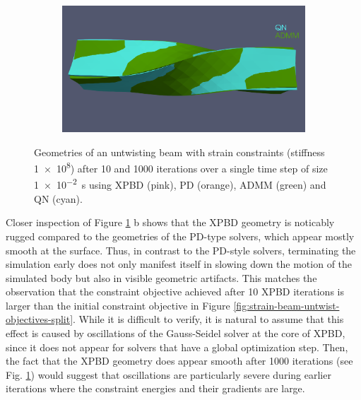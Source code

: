 \begin{figure}
\begin{subfigure}{0.49\textwidth}
    \end{subfigure}
    \hspace{0.001\textwidth}
    \begin{subfigure}{0.49\textwidth}
        \includegraphics[width=\textwidth, trim={0 4.5cm 0 2.15cm}, clip]{figures/strain_beam_untwist_QN_vs_ADMM_10_iterations.png}
    \end{subfigure}
    \caption{Geometries of an untwisting beam with strain constraints (stiffness \num{1e8}) after 10 and 1000 iterations over a single time step of size 
        \SI{1e-2}{\second} using XPBD (pink), PD (orange), ADMM (green) and QN (cyan).}
    \label{fig:strain-beam-untwist-geometries}
\end{figure}

Closer inspection of Figure \ref{fig:strain-beam-untwist-geometries} b shows that the XPBD geometry is noticably rugged compared to the geometries of the PD-type 
solvers, which 
appear mostly smooth at the surface. Thus, in contrast to the PD-style solvers, terminating the simulation early does not only manifest itself in slowing down 
the motion of the simulated body but also in visible geometric artifacts. This matches the observation that the constraint objective achieved after 10 XPBD iterations 
is larger than the initial constraint objective in Figure \ref{fig:strain-beam-untwist-objectives-split}. While it is difficult to verify, it is natural to assume that this 
effect is caused by oscillations of the Gauss-Seidel solver at the core of XPBD, since it does not appear for solvers that have a global optimization step. Then, the 
fact that the XPBD geometry does appear smooth after 1000 iterations (see Fig. \ref{fig:strain-beam-untwist-geometries}) would suggest that oscillations are particularly 
severe during earlier iterations where the constraint energies and their gradients are large.


